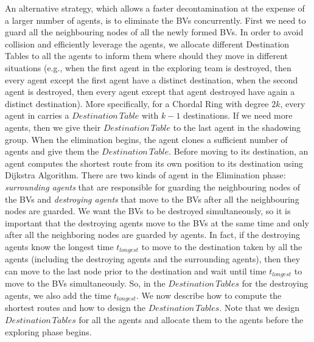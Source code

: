 An alternative strategy, which allows a faster decontamination at the expense of a larger number of agents, is to  eliminate  the BVs concurrently.
First we need to guard all the neighbouring nodes of all the newly formed BVs. In order to avoid collision and efficiently leverage the agents, we allocate different Destination Tables to all the agents   to inform them where should they   move in different situations (e.g., when the first agent in the exploring team is destroyed, then every agent except the first agent have a distinct destination, when the second agent is destroyed, then every agent except that agent destroyed have again a distinct destination). More specifically, for a Chordal Ring with   degree $2k$, every agent in  carries a $Destination\,Table$ with $k-1$ destinations. If we need more agents, then we   give their $Destination\,Table$ to the last agent in the shadowing group. When the elimination begins, the agent clones a sufficient  number of agents and give them   the    $Destination\, Table$. 
Before moving to its destination, an agent computes the shortest route from its own position to its destination using Dijkstra Algorithm. There are two kinds of agent in the Elimination phase: {\em surrounding agents} that are responsible for guarding the neighbouring nodes of the BVs and {\em destroying agents} that move to the BVs after all the neighbouring nodes are guarded. We want the BVs to be destroyed simultaneously, so it is important that the destroying agents move to the BVs at the same time and only after all the neighboring nodes are guarded by agents. In fact, if the destroying agents know the longest time $t_{longest}$ to move to the destination taken by all the agents (including the destroying agents and the surrounding agents), then they can move to the last node prior to the destination and wait until time  $t_{longest}$ to move to the BVs simultaneously. So,  in the $Destination\,Tables$ for the destroying agents, we also add  the time   $t_{longest}$. We now  describe how to compute the shortest routes and how to design the $Destination\,Tables$. Note that we design $Destination\,Tables$ for all the agents and allocate them to the agents before the exploring phase begins.

